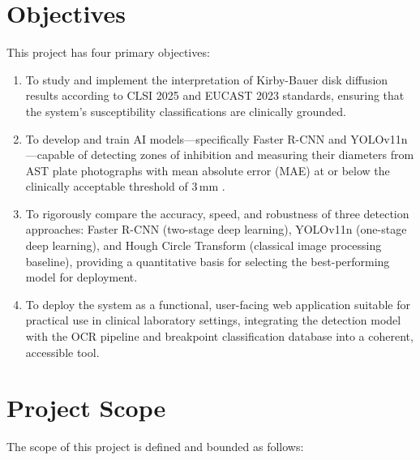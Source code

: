 \section{Objectives}

This project has four primary objectives:
\begin{enumerate}
  \item To study and implement the interpretation of Kirby-Bauer disk diffusion results
        according to CLSI 2025 \cite{clsi2025} and EUCAST 2023 \cite{eucast2023} standards,
        ensuring that the system's susceptibility classifications are clinically grounded.
  \item To develop and train AI models---specifically Faster R-CNN and YOLOv11n---capable of
        detecting zones of inhibition and measuring their diameters from AST plate photographs
        with mean absolute error (MAE) at or below the clinically acceptable threshold of 3\,mm
        \cite{humphries2018}.
  \item To rigorously compare the accuracy, speed, and robustness of three detection approaches:
        Faster R-CNN (two-stage deep learning), YOLOv11n (one-stage deep learning), and Hough
        Circle Transform (classical image processing baseline), providing a quantitative basis
        for selecting the best-performing model for deployment.
  \item To deploy the system as a functional, user-facing web application suitable for practical
        use in clinical laboratory settings, integrating the detection model with the OCR pipeline
        and breakpoint classification database into a coherent, accessible tool.
\end{enumerate}

\section{Project Scope}

The scope of this project is defined and bounded as follows:

